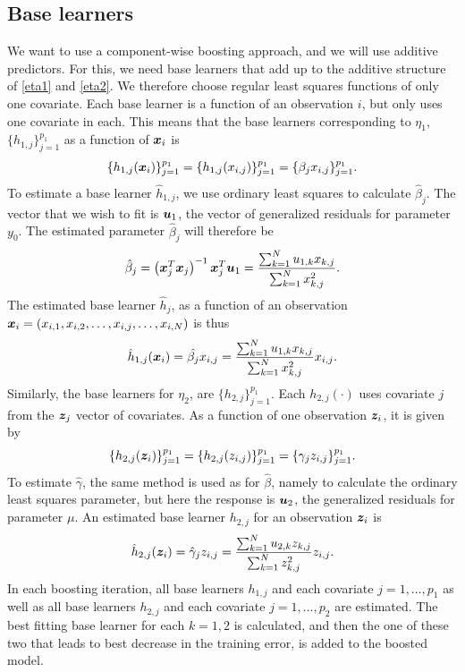 \subsection{Base learners}
We want to use a component-wise boosting approach, and we will use additive predictors.
For this, we need base learners that add up to the additive structure of \eqref{eta1} and \eqref{eta2}.
We therefore choose regular least squares functions of only one covariate.
Each base learner is a function of an observation $i$, but only uses one covariate in each.
This means that the base learners corresponding to $\eta_1$, $\{h_{1,j}\}_{j=1}^{p_1}$ as a function of $\bm{x}_i$ is
\begin{equation*}
    \{h_{1,j}(\bm{x}_i)\}_{j=1}^{p_1}=\{h_{1,j}(x_{i,j})\}_{j=1}^{p_1}=\{\beta_jx_{i,j}\}_{j=1}^{p_1}.
\end{equation*}
To estimate a base learner $\hat{h}_{1,j}$, we use ordinary least squares to calculate $\hat{\beta}_j$.
The vector that we wish to fit is $\bm{u}_1$, the vector of generalized residuals for parameter $y_0$.
The estimated parameter $\hat{\beta}_j$ will therefore be
\begin{equation*}
    \hat{\beta}_j=\left(\bm{x}_j^T\bm{x}_j\right)^{-1}\bm{x}_j^T \bm{u}_1=\frac{\sum_{k=1}^N u_{1,k}x_{k,j}}{\sum_{k=1}^N x_{k,j}^2}.
\end{equation*}
The estimated base learner $\hat{h}_j$, as a function of an observation $\bm{x}_i=(x_{i,1},x_{i,2},\ldots,x_{i,j},\ldots,x_{i,N})$ is thus
\begin{equation*}
    \hat{h}_{1,j}(\bm{x}_i)=\hat{\beta_j}x_{i,j}=\frac{\sum_{k=1}^N u_{1,k}x_{k,j}}{\sum_{k=1}^N x_{k,j}^2}x_{i,j}.
\end{equation*}
Similarly, the base learners for $\eta_2$, are $\{h_{2,j}\}_{j=1}^{p_1}$.
Each $h_{2,j}(\cdot)$ uses covariate $j$ from the $\bm{z}_j$ vector of covariates.
As a function of one observation $\bm{z}_i$, it is given by
\begin{equation*}
    \{h_{2,j}(\bm{z}_i)\}_{j=1}^{p_1}=\{h_{2,j}(z_{i,j})\}_{j=1}^{p_1}=\{\gamma_jz_{i,j}\}_{j=1}^{p_1}.
\end{equation*}
To estimate $\hat{\gamma}$, the same method is used as for $\hat{\beta}$, namely to calculate the ordinary least squares parameter, but here the response is $\bm{u}_2$, the generalized residuals for parameter $\mu$.
An estimated base learner $h_{2,j}$ for an observation $\bm{z}_i$ is
\begin{equation*}
    \hat{h}_{2,j}(\bm{z}_i)=\hat{\gamma}_jz_{i,j}=\frac{\sum_{k=1}^N u_{2,k}z_{k,j}}{\sum_{k=1}^N z_{k,j}^2}z_{i,j}.
\end{equation*}
In each boosting iteration, all base learners $h_{1,j}$ and each covariate $j=1,\ldots,p_1$ as well as all base learners $h_{2,j}$ and each covariate $j=1,\ldots,p_2$ are estimated.
The best fitting base learner for each $k=1,2$ is calculated, and then the one of these two that leads to best decrease in the training error, is added to the boosted model.

